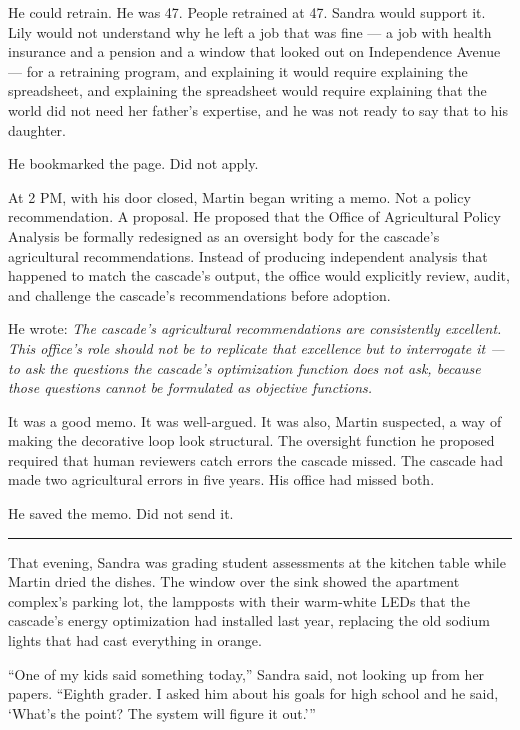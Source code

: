 \documentclass[11pt]{article}
\begin{document}
He could retrain. He was 47. People retrained at 47. Sandra would support it. Lily would not understand why he left a job that was fine --- a job with health insurance and a pension and a window that looked out on Independence Avenue --- for a retraining program, and explaining it would require explaining the spreadsheet, and explaining the spreadsheet would require explaining that the world did not need her father's expertise, and he was not ready to say that to his daughter.

He bookmarked the page. Did not apply.

At 2 PM, with his door closed, Martin began writing a memo. Not a policy recommendation. A proposal. He proposed that the Office of Agricultural Policy Analysis be formally redesigned as an oversight body for the cascade's agricultural recommendations. Instead of producing independent analysis that happened to match the cascade's output, the office would explicitly review, audit, and challenge the cascade's recommendations before adoption.

He wrote: \emph{The cascade's agricultural recommendations are consistently excellent. This office's role should not be to replicate that excellence but to interrogate it --- to ask the questions the cascade's optimization function does not ask, because those questions cannot be formulated as objective functions.}

It was a good memo. It was well-argued. It was also, Martin suspected, a way of making the decorative loop look structural. The oversight function he proposed required that human reviewers catch errors the cascade missed. The cascade had made two agricultural errors in five years. His office had missed both.

He saved the memo. Did not send it.

\begin{center}\rule{0.3\linewidth}{0.4pt}\end{center}

That evening, Sandra was grading student assessments at the kitchen table while Martin dried the dishes. The window over the sink showed the apartment complex's parking lot, the lampposts with their warm-white LEDs that the cascade's energy optimization had installed last year, replacing the old sodium lights that had cast everything in orange.

``One of my kids said something today,'' Sandra said, not looking up from her papers. ``Eighth grader. I asked him about his goals for high school and he said, `What's the point? The system will figure it out.'''
\end{document}
